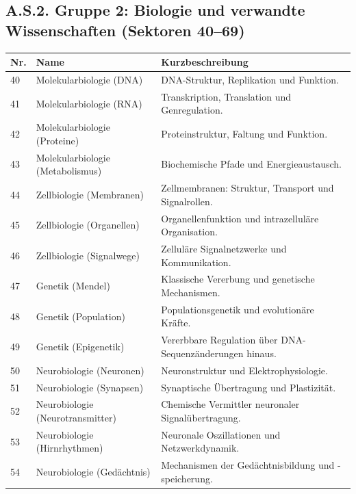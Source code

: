 \documentclass[13pt,a4paper]{article}
\begin{document}
	\subsection*{A.S.2. Gruppe 2: Biologie und verwandte Wissenschaften (Sektoren 40--69)}
	
	\begin{longtable}{|p{0.9cm}|p{6.0cm}|p{8.6cm}|}
		\hline
		\textbf{Nr.} & \textbf{Name} & \textbf{Kurzbeschreibung} \\
		\hline
		\endhead
		40 & Molekularbiologie (DNA) & DNA-Struktur, Replikation und Funktion. \\
		\hline
		41 & Molekularbiologie (RNA) & Transkription, Translation und Genregulation. \\
		\hline
		42 & Molekularbiologie (Proteine) & Proteinstruktur, Faltung und Funktion. \\
		\hline
		43 & Molekularbiologie (Metabolismus) & Biochemische Pfade und Energieaustausch. \\
		\hline
		44 & Zellbiologie (Membranen) & Zellmembranen: Struktur, Transport und Signalrollen. \\
		\hline
		45 & Zellbiologie (Organellen) & Organellenfunktion und intrazelluläre Organisation. \\
		\hline
		46 & Zellbiologie (Signalwege) & Zelluläre Signalnetzwerke und Kommunikation. \\
		\hline
		47 & Genetik (Mendel) & Klassische Vererbung und genetische Mechanismen. \\
		\hline
		48 & Genetik (Population) & Populationsgenetik und evolutionäre Kräfte. \\
		\hline
		49 & Genetik (Epigenetik) & Vererbbare Regulation über DNA-Sequenzänderungen hinaus. \\
		\hline
		50 & Neurobiologie (Neuronen) & Neuronstruktur und Elektrophysiologie. \\
		\hline
		51 & Neurobiologie (Synapsen) & Synaptische Übertragung und Plastizität. \\
		\hline
		52 & Neurobiologie (Neurotransmitter) & Chemische Vermittler neuronaler Signalübertragung. \\
		\hline
		53 & Neurobiologie (Hirnrhythmen) & Neuronale Oszillationen und Netzwerkdynamik. \\
		\hline
		54 & Neurobiologie (Gedächtnis) & Mechanismen der Gedächtnisbildung und -speicherung. \\
		\hline

\end{longtable}
\end{document}
